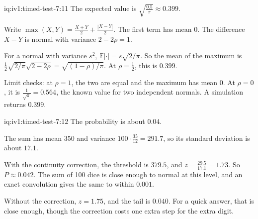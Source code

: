 \begin{solution}{iq:iv1:timed-test-7:11}
The expected value is $\sqrt{\frac{0.5}{\pi}} \approx 0.399$.

Write $\max(X, Y) = \frac{X + Y}{2} + \frac{|X - Y|}{2}$. The first term has mean 0. The difference $X - Y$ is normal with variance $2 - 2\rho = 1$.

For a normal with variance $s^2$, $\mathbb{E}|\cdot| = s\sqrt{2/\pi}$. So the mean of the maximum is $\frac12\sqrt{2/\pi}\sqrt{2 - 2\rho} = \sqrt{(1 - \rho)/\pi}$. At $\rho = \frac12$, this is $0.399$.

Limit checks: at $\rho = 1$, the two are equal and the maximum has mean 0. At $\rho = 0$, it is $\frac{1}{\sqrt\pi} = 0.564$, the known value for two independent normals. A simulation returns $0.399$.

\end{solution}

\begin{solution}{iq:iv1:timed-test-7:12}
The probability is about $0.04$.

The sum has mean 350 and variance $100 \cdot \frac{35}{12} = 291.7$, so its standard deviation is about $17.1$.

With the continuity correction, the threshold is $379.5$, and $z = \frac{29.5}{17.1} = 1.73$. So $P \approx 0.042$. The sum of 100 dice is close enough to normal at this level, and an exact convolution gives the same to within $0.001$.

Without the correction, $z = 1.75$, and the tail is $0.040$. For a quick answer, that is close enough, though the correction costs one extra step for the extra digit.

\end{solution}
